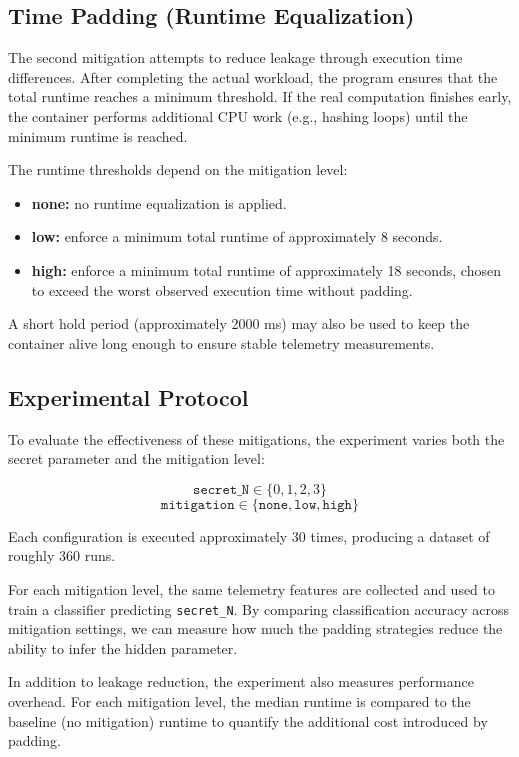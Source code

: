 \documentclass[11pt]{article}
\begin{document}
\subsection*{Time Padding (Runtime Equalization)}

The second mitigation attempts to reduce leakage through execution time differences. After completing the actual workload, the program ensures that the total runtime reaches a minimum threshold. If the real computation finishes early, the container performs additional CPU work (e.g., hashing loops) until the minimum runtime is reached.

The runtime thresholds depend on the mitigation level:

\begin{itemize}
    \item \textbf{none:} no runtime equalization is applied.
    \item \textbf{low:} enforce a minimum total runtime of approximately 8 seconds.
    \item \textbf{high:} enforce a minimum total runtime of approximately 18 seconds, chosen to exceed the worst observed execution time without padding.
\end{itemize}

A short hold period (approximately 2000 ms) may also be used to keep the container alive long enough to ensure stable telemetry measurements.

\subsection*{Experimental Protocol}

To evaluate the effectiveness of these mitigations, the experiment varies both the secret parameter and the mitigation level:

\[
\texttt{secret\_N} \in \{0,1,2,3\}
\]
\[
\texttt{mitigation} \in \{\texttt{none}, \texttt{low}, \texttt{high}\}
\]

Each configuration is executed approximately 30 times, producing a dataset of roughly 360 runs.

For each mitigation level, the same telemetry features are collected and used to train a classifier predicting \texttt{secret\_N}. By comparing classification accuracy across mitigation settings, we can measure how much the padding strategies reduce the ability to infer the hidden parameter.

In addition to leakage reduction, the experiment also measures performance overhead. For each mitigation level, the median runtime is compared to the baseline (no mitigation) runtime to quantify the additional cost introduced by padding.
\end{document}
